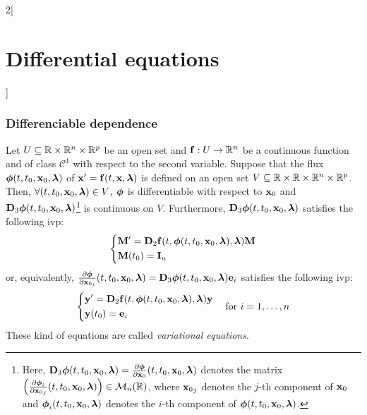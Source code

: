 \documentclass[../../../main.tex]{subfiles}
\begin{document}
\begin{multicols}{2}[\section{Differential equations}]
    \subsubsection{Differenciable dependence}
    \begin{theorem}[Dependence on $\vf{x}_0$]
        Let $U\subseteq\RR\times\RR^n\times\RR^p$ be an open set and $\vf{f}:U\rightarrow\RR^n$ be a continuous function and of class $\mathcal{C}^1$ with respect to the second variable. Suppose that the flux $\vf{\phi}(t,t_0,\vf{x}_0,\vf{\lambda})$ of $\vf{x}'=\vf{f}(t,\vf{x},\vf{\lambda})$ is defined on an open set $V\subseteq\RR\times\RR\times\RR^n\times\RR^p$. Then, $\forall (t,t_0,\vf{x}_0,\vf{\lambda})\in V$, $\vf{\phi}$ is differentiable with respect to $\vf{x}_0$ and $\vf{D}_3\vf{\phi}(t,t_0,\vf{x}_0,\vf{\lambda})$\footnote{Here, $\vf{D}_3\vf{\phi}(t,t_0,\vf{x}_0,\vf{\lambda})=\frac{\partial\vf{\phi}}{\partial \vf{x}_0}(t,t_0,\vf{x}_0,\vf{\lambda})$ denotes the matrix $\left(\frac{\partial\vf{\phi}_i}{\partial{\vf{x}_0}_j}(t,t_0,\vf{x}_0,\vf{\lambda})\right)\in\mathcal{M}_n(\RR)$, where ${\vf{x}_0}_j$ denotes the $j$-th component of $\vf{x}_0$ and $\vf{\phi}_i(t,t_0,\vf{x}_0,\vf{\lambda})$ denotes the $i$-th component of $\vf{\phi}(t,t_0,\vf{x}_0,\vf{\lambda})$.} is continuous on $V$. Furthermore, $\vf{D}_3\vf{\phi}(t,t_0,\vf{x}_0,\vf{\lambda})$ satisfies the following ivp:
        \begin{equation*}
            \left\{
            \begin{aligned}
                 & \vf{M}'      =\vf{D}_2\vf{f}(t,\vf{\phi}(t,t_0,\vf{x}_0,\vf{\lambda}),\vf{\lambda})\vf{M} \\
                 & \vf{M}(t_0)  =\vf{I}_n
            \end{aligned}
            \right.
        \end{equation*}
        or, equivalently, $\frac{\partial\vf{\phi}}{\partial {\vf{x}_0}_i}(t,t_0,\vf{x}_0,\vf{\lambda})=\vf{D}_3\vf{\phi}(t,t_0,\vf{x}_0,\vf{\lambda})\vf{e}_i$ satisfies the following ivp:
        $$
            \left\{
            \begin{aligned}
                 & \vf{y}'      =\vf{D}_2\vf{f}(t,\vf{\phi}(t,t_0,\vf{x}_0,\vf{\lambda}),\vf{\lambda})\vf{y} \\
                 & \vf{y}(t_0)  =\vf{e}_i
            \end{aligned}
            \right.\quad\text{for }i=1,\ldots,n
        $$
        These kind of equations are called \textit{variational equations}.
    \end{theorem}

\end{multicols}
\end{document}
